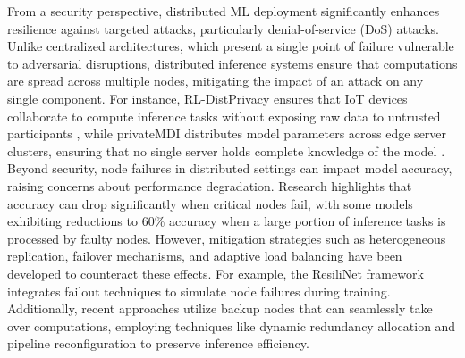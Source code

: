\documentclass[conference]{IEEEtran}
\begin{document}
From a security perspective, distributed ML deployment significantly enhances resilience against targeted attacks, particularly denial-of-service (DoS) attacks. Unlike centralized architectures, which present a single point of failure vulnerable to adversarial disruptions, distributed inference systems ensure that computations are spread across multiple nodes, mitigating the impact of an attack on any single component. For instance, RL-DistPrivacy ensures that IoT devices collaborate to compute inference tasks without exposing raw data to untrusted participants \cite{baccour2022rl}, while privateMDI distributes model parameters across edge server clusters, ensuring that no single server holds complete knowledge of the model \cite{dehkordi2024privacy}. Beyond security, node failures in distributed settings can impact model accuracy, raising concerns about performance degradation. Research highlights that accuracy can drop significantly when critical nodes fail, with some models exhibiting reductions to 60\% accuracy when a large portion of inference tasks is processed by faulty nodes. However, mitigation strategies such as heterogeneous replication, failover mechanisms, and adaptive load balancing have been developed to counteract these effects. For example, the ResiliNet framework \cite{yousefpour2020resilinet} integrates failout techniques to simulate node failures during training. Additionally, recent approaches utilize backup nodes that can seamlessly take over computations, employing techniques like dynamic redundancy allocation and pipeline reconfiguration to preserve inference efficiency.

\end{document}
